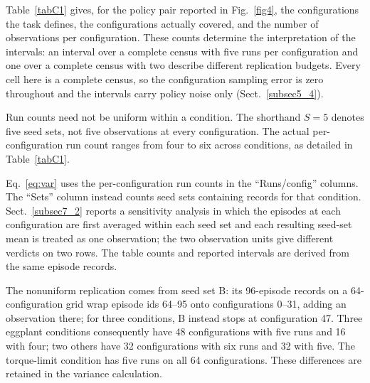 \documentclass[pdflatex,iicol,sn-apa]{sn-jnl}
\theoremstyle{remark}
\begin{document}
\begin{appendices}
Table~\ref{tabC1} gives, for the policy pair reported in Fig.~\ref{fig4}, the configurations the task defines, the configurations actually covered, and the
number of observations per configuration. These counts determine the interpretation of the intervals: an
interval over a complete census with five runs per configuration and one over a complete census with
two describe different replication budgets. Every cell here is a
complete census, so the configuration sampling error is zero throughout and the intervals carry
policy noise only (Sect.~\ref{subsec5_4}).

Run counts need not be uniform within a condition. The shorthand $S = 5$ denotes five seed sets,
not five observations at every configuration. The actual per-configuration run count ranges from
four to six across conditions, as detailed in Table~\ref{tabC1}.

Eq.~\eqref{eq:var} uses the per-configuration run counts in the ``Runs/config'' columns.
The ``Sets'' column instead counts seed sets containing records for that condition.
Sect.~\ref{subsec7_2} reports a sensitivity analysis in which the episodes at each configuration
are first averaged within each seed set and each resulting seed-set mean is treated as one
observation; the two observation units give different verdicts on two rows. The table counts
and reported intervals are derived from the same episode records.

The nonuniform replication comes from seed set B: its 96-episode records on a 64-configuration grid wrap episode ids 64--95 onto configurations 0--31, adding an observation there; for three conditions, B instead stops at configuration 47. Three eggplant conditions consequently have 48 configurations with five runs and 16 with four; two others have 32 configurations with six runs and 32 with five. The torque-limit condition has five runs on all 64 configurations. These differences are retained in the variance calculation.


\end{appendices}
\end{document}
